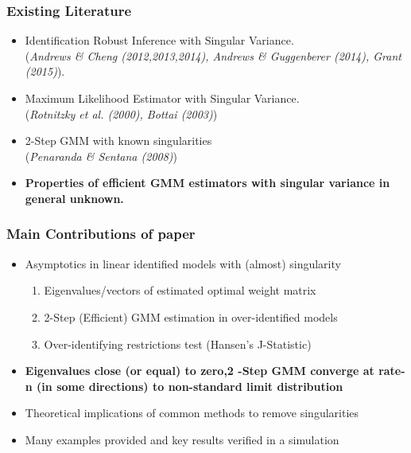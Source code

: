 \documentclass{beamer}
\begin{document}
\begin{frame}
\frametitle{Existing Literature}
\begin{itemize}
\item Identification Robust Inference with Singular Variance.\\
(\textit{Andrews \& Cheng (2012,2013,2014), Andrews \& Guggenberer (2014), Grant (2015)}).
    \vspace{14pt}

 \item Maximum Likelihood Estimator with Singular Variance.\\
  (\textit{Rotnitzky et al. (2000), Bottai (2003)})
    \vspace{14pt}

 \item 2-Step GMM with known singularities \\
 (\textit{Penaranda \& Sentana (2008)})

     \vspace{14pt}
 \item[]\textbf{Properties of efficient GMM estimators with singular variance in general unknown.}

\end{itemize}
\end{frame}






\begin{frame}
\frametitle{Main Contributions of paper}
\begin{itemize}


\item[] Asymptotics in linear identified models with (almost) singularity
\vspace{14pt}
\begin{enumerate}
\item Eigenvalues/vectors of estimated optimal weight matrix
\vspace{10pt}
\item  2-Step (Efficient) GMM estimation in over-identified models
\vspace{14pt}
\item Over-identifying restrictions test (Hansen's J-Statistic)
\end{enumerate}
\vspace{14pt}
\item[] \textbf{Eigenvalues close (or equal) to zero,2 -Step GMM converge at rate-n (in some directions)  to non-standard limit distribution}
\vspace{14pt}
\item[] Theoretical implications of common methods to remove singularities
\vspace{14pt}
\item[] Many examples provided and  key results verified in a simulation

\end{itemize}
\end{frame}
\end{document}
